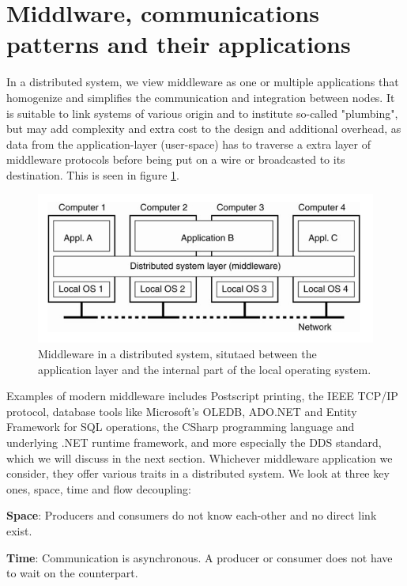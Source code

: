 \section{Middlware, communications patterns and their applications}

In a distributed system, we view middleware as one or multiple applications that homogenize and simplifies the communication and integration between nodes. It is suitable to link systems of various origin and to institute so-called "plumbing", but may add complexity and extra cost to the design and additional overhead, as data from the application-layer (user-space) has to traverse a extra layer of middleware protocols before being put on a wire or broadcasted to its destination. This is seen in figure \ref{fig:middleware}. 

\begin{figure}[h!]\label{}
	\centering
	\includegraphics[scale=0.5]{middleware/middlewaredist.png}
	\caption{Middleware in a distributed system, situtaed between the application layer and the internal part of the local operating system.}
	\label{fig:middleware}
\end{figure}

Examples of modern middleware includes Postscript printing, the IEEE TCP/IP protocol, database tools like Microsoft's OLEDB, ADO.NET and Entity Framework for SQL operations, the CSharp programming language and underlying .NET runtime framework, and more especially the DDS standard, which we will discuss in the next section. Whichever middleware application we consider, they offer various traits in a distributed system. We look at three key ones, space, time and flow decoupling:

\textbf{Space}: Producers and consumers do not know each-other and no direct link exist.

\textbf{Time}: Communication is asynchronous. A producer or consumer does not have to wait on the counterpart.

